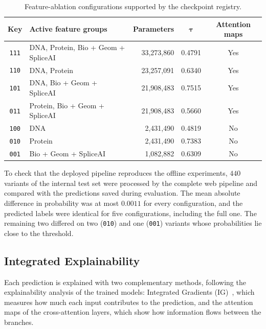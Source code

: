 \begin{table}[htbp]
    \centering
    \caption{Feature-ablation configurations supported by the checkpoint registry.}
    \label{tab:ablation_configs}
    \begin{tabular}{clrcc}
        \toprule
        \textbf{Key} & \textbf{Active feature groups} & \textbf{Parameters} & $\boldsymbol{\tau}$ & \textbf{Attention maps} \\
        \midrule
        \texttt{111} & DNA, Protein, Bio + Geom + SpliceAI & 33,273,860 & 0.4791 & Yes \\
        \texttt{110} & DNA, Protein & 23,257,091 & 0.6340 & Yes \\
        \texttt{101} & DNA, Bio + Geom + SpliceAI & 21,908,483 & 0.7515 & Yes \\
        \texttt{011} & Protein, Bio + Geom + SpliceAI & 21,908,483 & 0.5660 & Yes \\
        \texttt{100} & DNA & 2,431,490 & 0.4819 & No \\
        \texttt{010} & Protein & 2,431,490 & 0.7383 & No \\
        \texttt{001} & Bio + Geom + SpliceAI & 1,082,882 & 0.6309 & No \\
        \bottomrule
    \end{tabular}
\end{table}

To check that the deployed pipeline reproduces the offline experiments, $440$ variants of the internal test set were processed by the complete web pipeline and compared with the predictions saved during evaluation. The mean absolute difference in probability was at most $0.0011$ for every configuration, and the predicted labels were identical for five configurations, including the full one. The remaining two differed on two (\texttt{010}) and one (\texttt{001}) variants whose probabilities lie close to the threshold.

\subsection{Integrated Explainability}

Each prediction is explained with two complementary methods, following the explainability analysis of the trained models: Integrated Gradients (IG)~\cite{sundararajan2017axiomatic}, which measures how much each input contributes to the prediction, and the attention maps of the cross-attention layers, which show how information flows between the branches.

